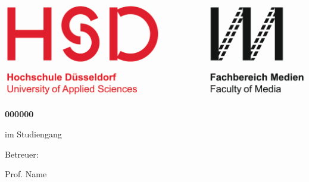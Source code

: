 \begin{titlepage}
\begin{flushright}

\includegraphics{img/hsd_logo}

\vspace{\baselineskip}
\vspace{\baselineskip}


{\huge\textbf{\thetitle}\par}

{\Large\textbf{\thesubtitle}\par}

\vspace{\baselineskip}

{\LARGE\textbf{\theauthor}\par}
{\LARGE\textbf{000000}\par}


\vfill


{\titleDocumentType} im Studiengang

\textbf{\degree}

\textbf{\thedate}

\vspace{\baselineskip}
\vspace{\baselineskip}

Betreuer:

Prof. Name

\end{flushright}
\end{titlepage}